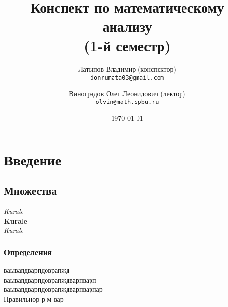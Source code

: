 \documentclass[12pt, a4paper]{article}
\title{Конспект по математическому анализу \\(1-й семестр)}
\author{
  Латыпов Владимир (конспектор)\\
  \texttt{donrumata03@gmail.com}
  \and
  Виноградов Олег Леонидович (лектор)\\
  \texttt{olvin@math.spbu.ru}
}
\date{\today}
\begin{document}
     \maketitle
     \newpage
     \tableofcontents
     \newpage
    

    \section{Введение}
    
    \subsection{Множества}
    
    \textit{Kurale}\\
    \textbf{Kurale}\\
    \textsl{Kurale}\\


    \subsubsection{Определения}
    
    \begin{theorem}
        
        ваывапдварпдоврапжд \\
        ваывапдварпдоврапждварпварп \\
        ваывапдварпдоврапждварпварпар \\
        Правильнор
        р
        м
        вар
    \end{theorem} 
\end{document}
